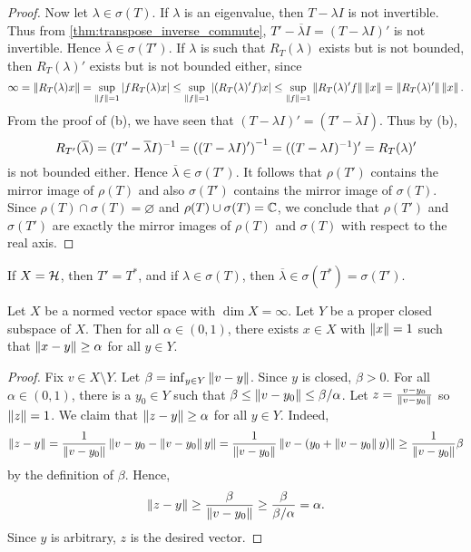 \begin{proof}
    Now let $\lambda\in\sigma(T)$. If $\lambda$ is an eigenvalue, then 
    $T-\lambda I$ is not invertible. Thus from \cref{thm:transpose_inverse_commute}, 
    $T' - \overline{\lambda}I = (T-\lambda I)'$ is not invertible. 
    Hence $\overline{\lambda}\in\sigma(T')$. If $\lambda$ is such that 
    $R_T(\lambda)$ exists but is not bounded, then $R_T(\lambda)'$ exists 
    but is not bounded either, since 
    \begin{equation*}
        \infty = \left\lVert {R_T(\lambda)x} \right\rVert = \sup_{\left\lVert {f} \right\rVert=1}\left\lvert {fR_T(\lambda)x} \right\rvert 
        \leq \sup_{\left\lVert {f} \right\rVert=1} \left\lvert {(R_T(\lambda)'f)x} \right\rvert 
        \leq \sup_{\left\lVert {f} \right\rVert=1}\left\lVert {R_T(\lambda)'f} \right\rVert\left\lVert {x} \right\rVert 
        = \left\lVert {R_T(\lambda)'} \right\rVert\left\lVert {x} \right\rVert.
    \end{equation*}
    From the proof of (b), we have seen that $(T-\lambda I)' = (T'-\overline{\lambda}I)$. 
    Thus by (b), 
    \begin{equation*}
        R_{T'}(\overline{\lambda}) = (T'-\overline{\lambda}I)^{-1} 
        = \pth{(T-\lambda I)'}^{-1} = ((T-\lambda I)^{-1})' = R_T(\lambda)'
    \end{equation*}
    is not bounded either. Hence $\overline{\lambda}\in\sigma(T')$. 
    It follows that $\rho(T')$ contains the mirror image of $\rho(T)$ 
    and also $\sigma(T')$ contains the mirror image of $\sigma(T)$. Since 
    $\rho(T)\cap\sigma(T) = \varnothing$ and $\rho(T)\cup\sigma(T) = \mathbb{C}$, 
    we conclude that $\rho(T')$ and $\sigma(T')$ are exactly the mirror 
    images of $\rho(T)$ and $\sigma(T)$ with respect to the real axis.
\end{proof}
\begin{remark}
    If $X = \mathcal{H}$, then $T' = T^*$, and if $\lambda\in\sigma(T)$, 
    then $\overline{\lambda}\in\sigma(T^*) = \sigma(T')$.
\end{remark}

\begin{lemma}[Riesz]
    Let $X$ be a normed vector space with $\dim X = \infty$. 
    Let $Y$ be a proper closed subspace of $X$. Then for all 
    $\alpha\in(0,1)$, there exists $x\in X$ with $\left\lVert {x} \right\rVert = 1$ 
    such that $\left\lVert {x-y} \right\rVert\geq \alpha$ for all $y\in Y$.
\end{lemma}
\begin{proof}
    Fix $v\in X\setminus Y$. Let $\beta = \inf_{y\in Y} \left\lVert {v - y} \right\rVert$. 
    Since $y$ is closed, $\beta > 0$. For all $\alpha\in (0,1)$, 
    there is a $y_0\in Y$ such that $\beta\leq\left\lVert {v - y_0} \right\rVert\leq \beta/\alpha$. 
    Let $z = \frac{v-y_0}{\left\lVert {v-y_0} \right\rVert}$ so $\left\lVert {z} \right\rVert = 1$. We claim 
    that $\left\lVert {z-y} \right\rVert\geq \alpha$ for all $y\in Y$. Indeed, 
    \begin{equation*}
        \left\lVert {z-y} \right\rVert = \frac{1}{\left\lVert {v-y_0} \right\rVert}\left\lVert {v - y_0 - \left\lVert {v-y_0} \right\rVert y} \right\rVert 
        = \frac{1}{\left\lVert {v-y_0} \right\rVert}\left\lVert {v - (y_0 + \left\lVert {v-y_0} \right\rVert y)} \right\rVert 
        \geq \frac{1}{\left\lVert {v-y_0} \right\rVert}\beta
    \end{equation*}
    by the definition of $\beta$. Hence, 
    \begin{equation*}
        \left\lVert {z-y} \right\rVert \geq \frac{\beta}{\left\lVert {v-y_0} \right\rVert} 
        \geq \frac{\beta}{\beta/\alpha} = \alpha. 
    \end{equation*}
    Since $y$ is arbitrary, $z$ is the desired vector.
\end{proof}

